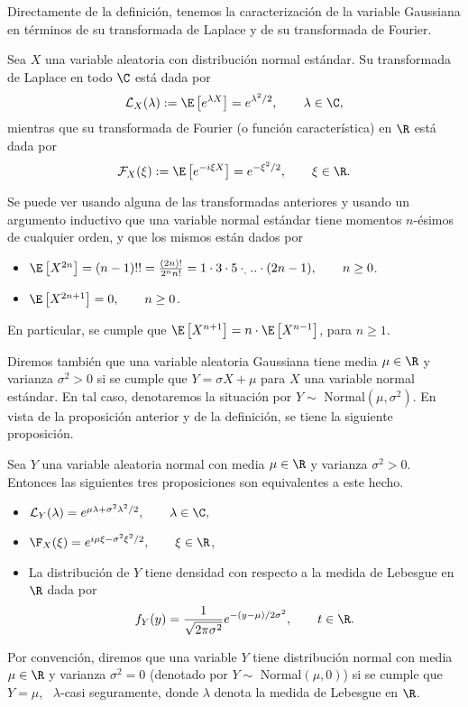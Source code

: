 Directamente de la definición, tenemos la caracterización de la variable Gaussiana en términos de su transformada de Laplace y de su transformada de Fourier.
\begin{prop} 
 Sea $X$ una variable aleatoria con distribución normal estándar. Su transformada de Laplace en todo $\C$ está dada por 
 \[
 \mathcal{L}_X(\lambda):=\E\left[e^{\lambda X}\right]=e^{\lambda^2/2}, \qquad \lambda\in \C,
 \]
mientras que su transformada de Fourier (o función característica) en $\R$ está dada por 
\[
\mathcal{F}_X(\xi):=\E\left[e^{-i\xi X}\right]=e^{-\xi^2/2}, \qquad \xi \in \R. 
\]
 \end{prop}
Se puede ver usando alguna de las transformadas anteriores y usando un argumento inductivo que una variable normal estándar tiene momentos $n$-ésimos de cualquier orden, y que los mismos están dados por 
 \begin{itemize}
   \item $\E\left[X^{2n}\right]=(n-1)!!=\frac{(2n)!}{2^nn!}=1\cdot3\cdot5\cdot_...\cdot (2n-1), \qquad n\geq0$.
   \item $\E\left[X^{2n+1}\right]=0, \qquad n\geq0$.
 \end{itemize}
 En particular, se cumple que $\E\left[X^{n+1}\right]=n\cdot \E\left[X^{n-1}\right]$, para $n\geq1$.

Diremos también que una variable aleatoria Gaussiana tiene media $\mu\in \R$ y varianza $\sigma^2>0$ si se cumple que $Y=\sigma X+\mu$ para $X$ una variable normal estándar. En tal caso, denotaremos la situación por $Y\sim$ Normal$(\mu,\sigma^2)$. En vista de la proposición anterior y de la definición, se tiene la siguiente proposición.
\begin{prop} 
 Sea $Y$ una variable aleatoria normal con media $\mu\in \R$ y varianza $\sigma^2>0$. Entonces las siguientes tres proposiciones son equivalentes a este hecho.
 \begin{itemize}
    \item $\mathcal{L}_Y(\lambda)=e^{\mu\lambda+\sigma^2\lambda^2/2}, \qquad \lambda \in \C,$
    \item $\F_X(\xi)=e^{i\mu\xi-\sigma^2\xi^2/2}, \qquad \xi \in \R$,
    \item La distribución de $Y$ tiene densidad con respecto a la medida de Lebesgue en $\R$ dada por 
    \[
        f_Y(y)=\frac{1}{\sqrt{2\pi\sigma^2}}e^{-(y-\mu)/2\sigma^2}, \qquad t\in \R.    
    \]
 \end{itemize}
 \end{prop}
 Por convención, diremos que una variable $Y$ tiene distribución normal con media $\mu\in \R$ y varianza $\sigma^2=0$ (denotado por $Y\sim$ Normal$(\mu,0)$) si se cumple que $Y=\mu$, \  $\lambda$-casi seguramente, donde $\lambda$ denota la medida de Lebesgue en $\R$.

